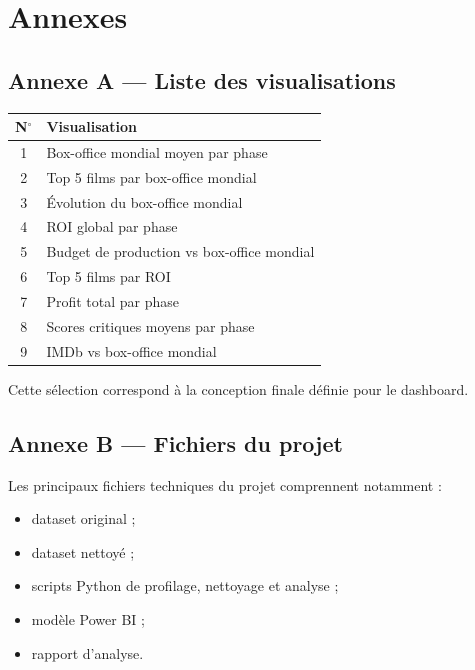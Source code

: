 \documentclass[a4paper,11pt]{article}
\begin{document}
\section{Annexes}

\subsection{Annexe A --- Liste des visualisations}

\begin{tabularx}{\linewidth}{@{}c X@{}}
  \toprule
  \textbf{N$^{\circ}$} & \textbf{Visualisation} \\
  \midrule
  1 & Box-office mondial moyen par phase \\
  2 & Top 5 films par box-office mondial \\
  3 & Évolution du box-office mondial \\
  4 & ROI global par phase \\
  5 & Budget de production vs box-office mondial \\
  6 & Top 5 films par ROI \\
  7 & Profit total par phase \\
  8 & Scores critiques moyens par phase \\
  9 & IMDb vs box-office mondial \\
  \bottomrule
\end{tabularx}

Cette sélection correspond à la conception finale définie pour le dashboard.

\subsection{Annexe B --- Fichiers du projet}

Les principaux fichiers techniques du projet comprennent notamment :
\begin{itemize}
  \item dataset original ;
  \item dataset nettoyé ;
  \item scripts Python de profilage, nettoyage et analyse ;
  \item modèle Power BI ;
  \item rapport d'analyse.
\end{itemize}
\end{document}
